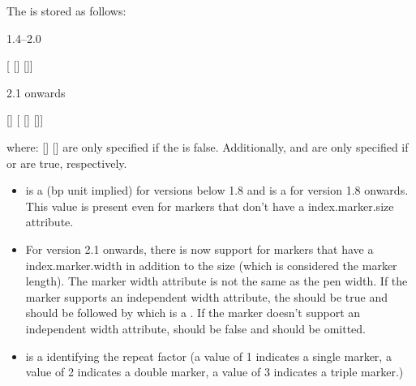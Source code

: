 \begin{numbered}
\begin{enumerate}
\begin{enumerate}
  The  is stored as follows:
  \begin{jdrversion}{1.4--2.0}
  \begin{syntaxline}
     
   
  [ []
   []]
  \end{syntaxline}
  \end{jdrversion}
  \begin{jdrversion}{2.1 onwards}
  \begin{syntaxline}
    []
    
   
  [ []
   []]
  \end{syntaxline}
  \end{jdrversion}
  where:
   []
   []
  are only specified if the  is false.
  Additionally,
   and  are only
  specified if  or 
  are true, respectively.

    \begin{itemize}
    \item {} is a  (\gls*{bp} unit implied) for
    versions below 1.8 and is a  for version 1.8 onwards.
    This value is present even for markers that don't have a 
    \gls{index.marker.size} attribute.

    \item For version 2.1 onwards, there is now support for markers
    that have a \gls{index.marker.width} in addition to the size (which is considered
    the marker length). The marker width attribute is not the same
    as the pen width. If the marker supports an independent width
    attribute, the   should be true
    and should be followed by  which is a .
    If the marker doesn't support an independent width attribute,
     should be false and  should be
    omitted.

    \item {} is a  identifying the repeat factor
    (a value of 1 indicates a single marker, a value of 2 indicates
    a double marker, a value of 3 indicates a triple marker.)


\end{itemize}
\end{enumerate}
\end{enumerate}
\end{numbered}
